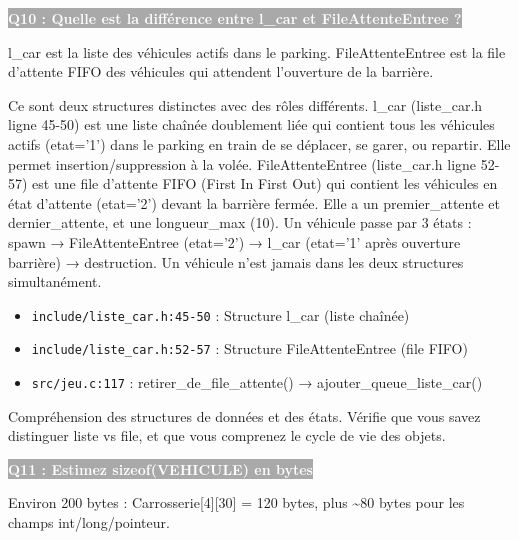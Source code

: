 \documentclass[12pt,a4paper]{article}
\newcommand{\question}[1]{%
    \vspace{0.5cm}
    \noindent\colorbox{darkgray}{\textcolor{white}{\textbf{#1}}}
    \vspace{0.3cm}
}
\begin{document}
\question{Q10 : Quelle est la différence entre l\_car et FileAttenteEntree ?}

\begin{reponse_courte}
l\_car est la liste des véhicules actifs dans le parking. FileAttenteEntree est la file d'attente FIFO des véhicules qui attendent l'ouverture de la barrière.
\end{reponse_courte}

\begin{reponse_longue}
Ce sont deux structures distinctes avec des rôles différents. l\_car (liste\_car.h ligne 45-50) est une liste chaînée doublement liée qui contient tous les véhicules actifs (etat='1') dans le parking en train de se déplacer, se garer, ou repartir. Elle permet insertion/suppression à la volée. FileAttenteEntree (liste\_car.h ligne 52-57) est une file d'attente FIFO (First In First Out) qui contient les véhicules en état d'attente (etat='2') devant la barrière fermée. Elle a un premier\_attente et dernier\_attente, et une longueur\_max (10). Un véhicule passe par 3 états : spawn → FileAttenteEntree (etat='2') → l\_car (etat='1' après ouverture barrière) → destruction. Un véhicule n'est jamais dans les deux structures simultanément.
\end{reponse_longue}

\begin{reference_code}
\begin{itemize}
    \item \texttt{include/liste\_car.h:45-50} : Structure l\_car (liste chaînée)
    \item \texttt{include/liste\_car.h:52-57} : Structure FileAttenteEntree (file FIFO)
    \item \texttt{src/jeu.c:117} : retirer\_de\_file\_attente() → ajouter\_queue\_liste\_car()
\end{itemize}
\end{reference_code}

\begin{objectif_prof}
Compréhension des structures de données et des états. Vérifie que vous savez distinguer liste vs file, et que vous comprenez le cycle de vie des objets.
\end{objectif_prof}

\question{Q11 : Estimez sizeof(VEHICULE) en bytes}

\begin{reponse_courte}
Environ 200 bytes : Carrosserie[4][30] = 120 bytes, plus \textasciitilde{}80 bytes pour les champs int/long/pointeur.
\end{reponse_courte}
\end{document}

